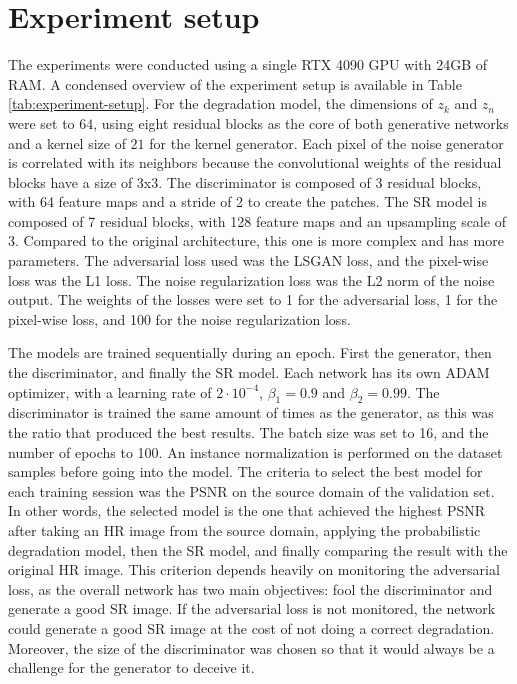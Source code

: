 \section{Experiment setup}

The experiments were conducted using a single RTX 4090 GPU with 24GB of RAM. A condensed overview of the experiment setup is available in Table \ref{tab:experiment-setup}.
For the degradation model, the dimensions of $z_k$ and $z_n$ were set to $64$, using eight residual blocks as the core of both generative networks and a kernel size of $21$ for the kernel generator. Each pixel of the noise generator is correlated with its neighbors because the convolutional weights of the residual blocks have a size of 3x3. The discriminator is composed of 3 residual blocks, with 64 feature maps and a stride of 2 to create the patches.
The SR model is composed of 7 residual blocks, with 128 feature maps and an upsampling scale of 3. Compared to the original architecture, this one is more complex and has more parameters.
The adversarial loss used was the LSGAN loss, and the pixel-wise loss was the L1 loss. The noise regularization loss was the L2 norm of the noise output. The weights of the losses were set to 1 for the adversarial loss, 1 for the pixel-wise loss, and 100 for the noise regularization loss.

The models are trained sequentially during an epoch. First the generator, then the discriminator, and finally the SR model. Each network has its own ADAM optimizer, with a learning rate of $2 \cdot 10^{-4}$,
 $\beta_1 = 0.9$ and $\beta_2 = 0.99$. The discriminator is trained the same amount of times as the generator, as this was the ratio that produced the best results. The batch size was set to 16, and the number of epochs to 100. An instance normalization is performed on the dataset samples before going into the model. The criteria to select the best model for each training session was the PSNR on the source domain of the validation set. 
In other words, the selected model is the one that achieved the highest PSNR after taking an HR image from the source domain, applying the probabilistic degradation model, then the SR model, and finally comparing the result with the original HR image.
This criterion depends heavily on monitoring the adversarial loss, as the overall network has two main objectives: fool the discriminator and generate a good SR image. If the adversarial loss is not monitored, the network could generate a good SR image at the cost of not doing a correct degradation. Moreover, the size of the discriminator was chosen so that it would always be a challenge for the generator to deceive it.

